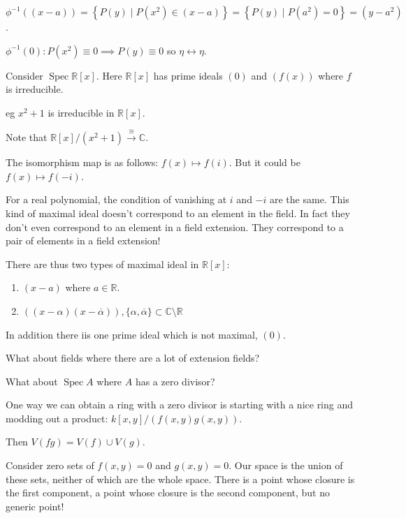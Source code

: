 \documentclass{article}
\theoremstyle{definition}
\begin{document}
    \(\phi ^{-1} ((x-a)) = \left\{ P(y) \mid P(x^2) \in (x-a) \right\} = \left\{ P(y) \mid P(a^2) = 0 \right\} = (y-a^2)\).
    
    \(\phi ^{-1} (0): P(x^2) \equiv 0 \implies P(y) \equiv 0\) so \(\eta \leftrightarrow \eta\).

    Consider \(\operatorname{Spec} \mathbb{R} [x]\). Here \(\mathbb{R} [x]\) has prime ideals \((0)\) and \((f(x))\) where \(f\) is irreducible.

    eg \(x^2 + 1\) is irreducible in \(\mathbb{R} [x]\).

    Note that \(\mathbb{R} [x] / (x^2 + 1) \xrightarrow{\cong} \mathbb{C}\).

    The isomorphism map is as follows: \(f(x) \mapsto f(i)\). But it could be \(f(x) \mapsto f(-i)\).

    For a real polynomial, the condition of vanishing at \(i\) and \(-i\) are the same. This kind of maximal ideal doesn't correspond to an element in the field. In fact they don't even correspond to an element in a field extension. They correspond to a pair of elements in a field extension!

    There are thus two types of maximal ideal in \(\mathbb{R} [x]\):

    \begin{enumerate}[label=\arabic*)]
        \item \((x-a)\) where \(a\in \mathbb{R}\).
        \item \(((x-\alpha)(x-\overline{\alpha})), \{ \alpha , \overline{\alpha} \} \subset \mathbb{C} \setminus \mathbb{R}\) 
    \end{enumerate} 

    In addition there iis one prime ideal which is not maximal, \((0)\).

    What about fields where there are a lot of extension fields?

    What about \(\operatorname{Spec} A\) where \(A\) has a zero divisor?

    One way we can obtain a ring with a zero divisor is starting with a nice ring and modding out a product: \(k[x,y] / (f(x,y)g(x,y))\).
    
    Then \(V(fg) = V(f) \cup V(g)\).

    Consider zero sets of \(f(x,y)=0\) and \(g(x,y)=0\). Our space is the union of these sets, neither of which are the whole space. There is a point whose closure is the first component, a point whose closure is the second component, but no generic point!
\end{document}
